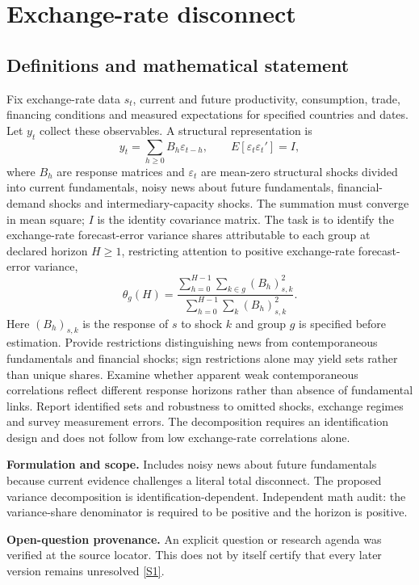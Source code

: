 \documentclass[11pt]{article}
\newcommand{\sref}[2]{\hyperlink{source:#1:#2}{[S#2]}}
\begin{document}
\section*{Exchange-rate disconnect}\label{30007613}
\subsection{Definitions and mathematical statement}
Fix exchange-rate data \(s_t\), current and future productivity, consumption, trade, financing conditions and measured expectations for specified countries and dates. Let \(y_t\) collect these observables. A structural representation is
\[y_t=\sum_{h\geq0}B_h\varepsilon_{t-h},\qquad E[\varepsilon_t\varepsilon_t']=I,\]
where \(B_h\) are response matrices and \(\varepsilon_t\) are mean-zero structural shocks divided into current fundamentals, noisy news about future fundamentals, financial-demand shocks and intermediary-capacity shocks. The summation must converge in mean square; \(I\) is the identity covariance matrix. The task is to identify the exchange-rate forecast-error variance shares attributable to each group at declared horizon \(H\geq1\), restricting attention to positive exchange-rate forecast-error variance,
\[\theta_g(H)=\frac{\sum_{h=0}^{H-1}\sum_{k\in g}(B_h)_{s,k}^2}{\sum_{h=0}^{H-1}\sum_k(B_h)_{s,k}^2}.\]
Here \((B_h)_{s,k}\) is the response of \(s\) to shock \(k\) and group \(g\) is specified before estimation. Provide restrictions distinguishing news from contemporaneous fundamentals and financial shocks; sign restrictions alone may yield sets rather than unique shares. Examine whether apparent weak contemporaneous correlations reflect different response horizons rather than absence of fundamental links. Report identified sets and robustness to omitted shocks, exchange regimes and survey measurement errors. The decomposition requires an identification design and does not follow from low exchange-rate correlations alone.

\par\textbf{Formulation and scope.} Includes noisy news about future fundamentals because current evidence challenges a literal total disconnect. The proposed variance decomposition is identification-dependent. Independent math audit: the variance-share denominator is required to be positive and the horizon is positive.

\par\textbf{Open-question provenance.} An explicit question or research agenda was verified at the source locator. This does not by itself certify that every later version remains unresolved \sref{30007613}{1}.
\end{document}
